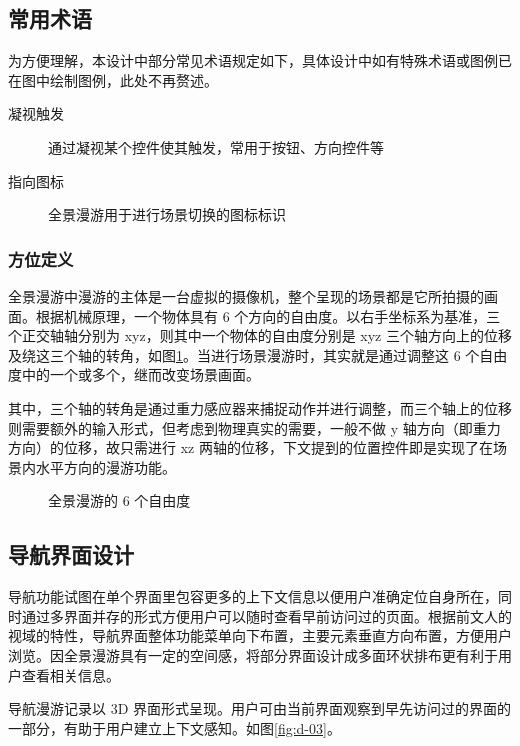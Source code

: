 \subsection{常用术语}
为方便理解，本设计中部分常见术语规定如下，具体设计中如有特殊术语或图例已在图中绘制图例，此处不再赘述。

\begin{description}
  \item [凝视触发] 通过凝视某个控件使其触发，常用于按钮、方向控件等
  \item [指向图标] 全景漫游用于进行场景切换的图标标识
\end{description}

\subsubsection{方位定义}
全景漫游中漫游的主体是一台虚拟的摄像机，整个呈现的场景都是它所拍摄的画面。根据机械原理，一个物体具有 6 个方向的自由度。以右手坐标系为基准，三个正交轴轴分别为 xyz，则其中一个物体的自由度分别是 xyz 三个轴方向上的位移及绕这三个轴的转角，如图\ref{fig:d-13}。当进行场景漫游时，其实就是通过调整这 6 个自由度中的一个或多个，继而改变场景画面。

其中，三个轴的转角是通过重力感应器来捕捉动作并进行调整，而三个轴上的位移则需要额外的输入形式，但考虑到物理真实的需要，一般不做 y 轴方向（即重力方向）的位移，故只需进行 xz 两轴的位移，下文提到的位置控件即是实现了在场景内水平方向的漫游功能。

\begin{figure}[htp]
\centering
{}
\caption{全景漫游的 6 个自由度}
\label{fig:d-13}
\end{figure}

\subsection{导航界面设计}
导航功能试图在单个界面里包容更多的上下文信息以便用户准确定位自身所在，同时通过多界面并存的形式方便用户可以随时查看早前访问过的页面。根据前文人的视域的特性，导航界面整体功能菜单向下布置，主要元素垂直方向布置，方便用户浏览。因全景漫游具有一定的空间感，将部分界面设计成多面环状排布更有利于用户查看相关信息。

导航漫游记录以 3D 界面形式呈现。用户可由当前界面观察到早先访问过的界面的一部分，有助于用户建立上下文感知。如图\ref{fig:d-03}。

